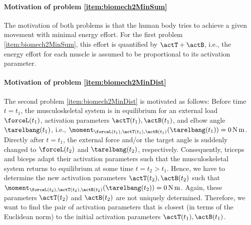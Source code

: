 \paragraph{Motivation of problem \ref{item:biomech2MinSum}}

The motivation of both problems is that the human body tries to
achieve a given movement with minimal energy effort.
For the first problem \ref{item:biomech2MinSum},
this effort is quantified by $\actT + \actB$,
i.e., the energy effort for each muscle is assumed to be proportional
to its activation parameter.

\paragraph{Motivation of problem \ref{item:biomech2MinDist}}

The second problem \ref{item:biomech2MinDist} is motivated as follows:
Before time $t = t_1$, the musculoskeletal system is in equilibrium for
an external load $\forceL(t_1)$,
activation parameters $\actT(t_1), \actB(t_1)$, and
elbow angle $\tarelbang(t_1)$, i.e.,
$\moment_{\forceL(t_1),\actT(t_1),\actB(t_1)}(\tarelbang(t_1))
= \SI{0}{\newton\meter}$.
Directly after $t = t_1$,
the external force and/or the target angle is suddenly changed
to $\forceL(t_2)$ and $\tarelbang(t_2)$, respectively.
Consequently, triceps and biceps adapt their activation parameters
such that the musculoskeletal system returns to equilibrium
at some time $t = t_2 > t_1$.
Hence, we have to determine the new activation parameters
$\actT(t_2), \actB(t_2)$ such that
$\moment_{\forceL(t_2),\actT(t_2),\actB(t_2)}(\tarelbang(t_2))
= \SI{0}{\newton\meter}$.
Again, these parameters
$\actT(t_2)$ and $\actB(t_2)$ are not uniquely determined.
Therefore, we want to find the pair of activation parameters
that is closest (in terms of the Euclidean norm) to the initial
activation parameters $\actT(t_1), \actB(t_1)$.

%


